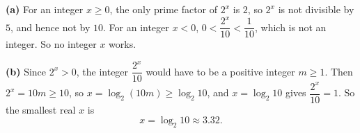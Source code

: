 \textbf{(a)} For an integer $x\ge0$, the only prime factor of $2^x$ is $2$, so $2^x$ is not divisible by $5$, and hence not by $10$. For an integer $x<0$, $0<\dfrac{2^x}{10}<\dfrac{1}{10}$, which is not an integer. So no integer $x$ works.

\textbf{(b)} Since $2^x>0$, the integer $\dfrac{2^x}{10}$ would have to be a positive integer $m\ge1$. Then $2^x=10m\ge10$, so $x=\log_2(10m)\ge\log_2 10$, and $x=\log_2 10$ gives $\dfrac{2^x}{10}=1$. So the smallest real $x$ is
\[x=\boxed{\log_2 10}\approx3.32 .\]
